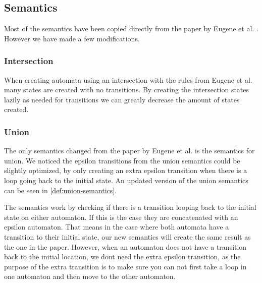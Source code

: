 \subsection{Semantics}\label{subsec:semantics}
\begin{comment}
    Where do most of our semantics come from?
    
    Intersection semantics
     - Motivation

    Describe union semantics
     - Motivation
     - New definition
     - Visual change
    
    Describe MatchAny semantics
     - Motivation
     - Definition
     - Visual
\end{comment}

Most of the semantics have been copied directly from the paper by Eugene et al. \cite{Eugene2001}. However we have made a few modifications.

\subsubsection{Intersection}
When creating automata using an intersection with the rules from Eugene et al.
many states are created with no transitions.
By creating the intersection states lazily as needed for transitions we can greatly decrease the amount of states created.

\subsubsection{Union}
The only semantics changed from the paper by Eugene et al. is the semantics for union. We noticed the epsilon transitions from the union semantics could be slightly optimized, by only creating an extra epsilon transition when there is a loop going back to the initial state. An updated version of the union semantics can be seen in \cref{def:union-semantics}.



The semantics work by checking if there is a transition looping back to the initial state on either automaton. If this is the case they are concatenated with an epsilon automaton. That means in the case where both automata have a transition to their initial state, our new semantics will create the same result as the one in the paper. However, when an automaton does not have a transition back to the initial location, we dont need the extra epsilon transition, as the purpose of the extra transition is to make sure you can not first take a loop in one automaton and then move to the other automaton.

